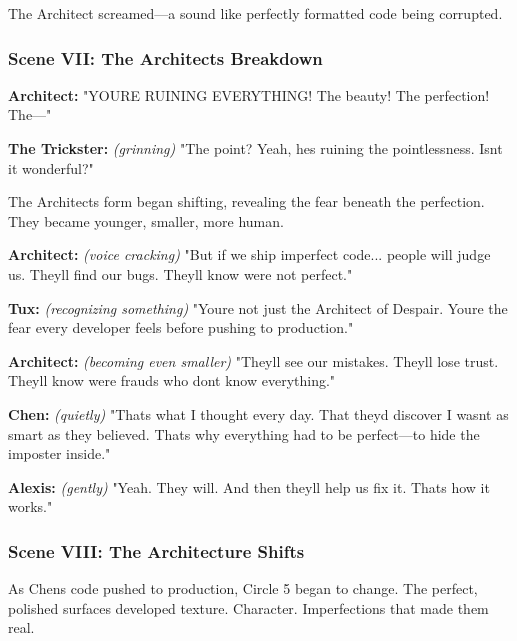 The Architect screamed---a sound like perfectly formatted code being corrupted.

\bookdivider

\subsubsection{Scene VII: The Architect\textquotesingle s Breakdown}\label{scene-vii-the-architects-breakdown}

\textbf{Architect:} "YOU\textquotesingle RE RUINING EVERYTHING! The beauty! The perfection! The---"

\textbf{The Trickster:} \emph{(grinning)} "The point? Yeah, he\textquotesingle s ruining the pointlessness. Isn\textquotesingle t it wonderful?"

The Architect\textquotesingle s form began shifting, revealing the fear beneath the perfection. They became younger, smaller, more human.

\textbf{Architect:} \emph{(voice cracking)} "But if we ship imperfect code... people will judge us. They\textquotesingle ll find our bugs. They\textquotesingle ll know we\textquotesingle re not perfect."

\textbf{Tux:} \emph{(recognizing something)} "You\textquotesingle re not just the Architect of Despair. You\textquotesingle re the fear every developer feels before pushing to production."

\textbf{Architect:} \emph{(becoming even smaller)} "They\textquotesingle ll see our mistakes. They\textquotesingle ll lose trust. They\textquotesingle ll know we\textquotesingle re frauds who don\textquotesingle t know everything."

\textbf{Chen:} \emph{(quietly)} "That\textquotesingle s what I thought every day. That they\textquotesingle d discover I wasn\textquotesingle t as smart as they believed. That\textquotesingle s why everything had to be perfect---to hide the imposter inside."

\textbf{Alexis:} \emph{(gently)} "Yeah. They will. And then they\textquotesingle ll help us fix it. That\textquotesingle s how it works."

\bookdivider

\subsubsection{Scene VIII: The Architecture Shifts}\label{scene-viii-the-architecture-shifts}

As Chen\textquotesingle s code pushed to production, Circle 5 began to change. The perfect, polished surfaces developed texture. Character. Imperfections that made them real.

